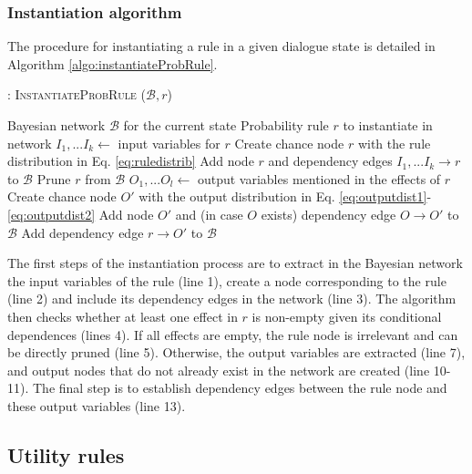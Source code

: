 \subsubsection*{Instantiation algorithm} 
\label{sec:utilruleinstantiation}

The procedure for instantiating a rule in a given dialogue state is detailed in Algorithm \ref{algo:instantiateProbRule}. 

\begin{algorithm}[h!]
\caption{: \textsc{InstantiateProbRule} ($\mathcal{B}, \mathit{r}$)}
\begin{algorithmic}[1] \vspace{1mm}
\REQUIRE Bayesian network $\mathcal{B}$ for the current state
\REQUIRE Probability rule $\mathit{r}$ to instantiate in network  \vspace{1mm}
\STATE $I_1,...I_k \leftarrow$ input variables for $\mathit{r}$
\STATE Create chance node $r$ with the rule distribution in Eq. \eqref{eq:ruledistrib}
\STATE Add node $r$ and dependency edges $I_1,...I_k \rightarrow r$ to $\mathcal{B}$ 
\STATE Prune $r$ from $\mathcal{B}$
\ELSE
\STATE $O_1,...O_l \leftarrow$ output variables mentioned in the effects of $r$
\STATE Create chance node $O'$ with the output distribution in Eq. \eqref{eq:outputdist1}-\eqref{eq:outputdist2}
\STATE Add node $O'$ and (in case $O$ exists) dependency edge $O \rightarrow O'$ to $\mathcal{B}$
\ENDIF
\STATE Add dependency edge $r \rightarrow O'$ to $\mathcal{B}$ 
\ENDFOR
\ENDIF
\end{algorithmic}
\label{algo:instantiateProbRule}
\end{algorithm}

The first steps of the instantiation process are to extract in the Bayesian network the input variables of the rule (line 1), create a node corresponding to the rule (line 2) and include its dependency edges in the network (line 3).  The algorithm then checks whether at least one effect in $r$ is non-empty given its conditional dependences (lines 4).  If all effects are empty, the rule node is irrelevant and can be directly pruned (line 5). Otherwise, the output variables are extracted (line 7), and output nodes that do not already exist in the network are created (line 10-11). The final step is to establish dependency edges between the rule node and these output variables (line 13).


\subsection{Utility rules}

